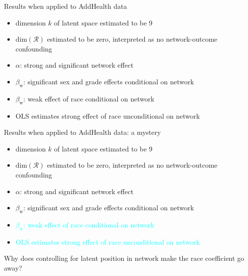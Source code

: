 \documentclass{beamer}
\theoremstyle{remark}
\begin{document}
\begin{frame}{Results when applied to AddHealth data}

    \begin{itemize}
        \item dimension $k$ of latent space estimated to be 9
        \item $\mathrm{dim}(\mathcal R)$ estimated to be zero, interpreted as no network-outcome confounding
        \item $\alpha$: strong and significant network effect
        \item $\beta_\text{w}$: significant sex and grade effects conditional on network
        \item $\beta_\text{w}$: weak effect of race conditional on network
        \item OLS estimates strong effect of race unconditional on network
    \end{itemize}

\end{frame}

\begin{frame}{Results when applied to AddHealth data: a mystery}

    \begin{itemize}
        \item dimension $k$ of latent space estimated to be 9
        \item $\mathrm{dim}(\mathcal R)$ estimated to be zero, interpreted as no network-outcome confounding
        \item $\alpha$: strong and significant network effect
        \item $\beta_\text{w}$: significant sex and grade effects conditional on network
        \item \textcolor{cyan}{$\beta_\text{w}$: weak effect of race conditional on network}
        \item \textcolor{cyan}{OLS estimates strong effect of race unconditional on network}
    \end{itemize}

    Why does controlling for latent position in network make the race coefficient go away?

\end{frame}
\end{document}
